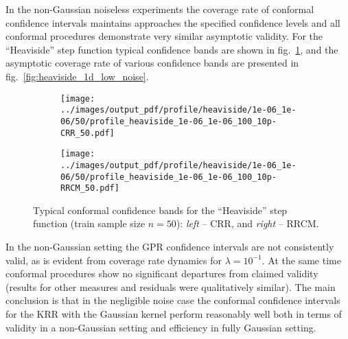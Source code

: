 \documentclass[conference]{IEEEtran}
\begin{document}
In the non-Gaussian noiseless experiments the coverage rate of conformal confidence
intervals maintains approaches the specified confidence levels and all conformal
procedures demonstrate very similar asymptotic validity. For the ``Heaviside''
step function typical confidence bands are shown in fig.~\ref{fig:nongauss_1d_heaviside},
and the asymptotic coverage rate of various confidence bands are presented in
fig.~\ref{fig:heaviside_1d_low_noise}.

\begin{figure}%
  \centering
  \begin{subfigure}[b]{0.5\linewidth}
    \texttt{[image: ../images/output\_pdf/profile/heaviside/1e-06\_1e-06/50/profile\_heaviside\_1e-06\_1e-06\_100\_10p-CRR\_50.pdf]}
  \end{subfigure}%
  \begin{subfigure}[b]{0.5\linewidth}
    \texttt{[image: ../images/output\_pdf/profile/heaviside/1e-06\_1e-06/50/profile\_heaviside\_1e-06\_1e-06\_100\_10p-RRCM\_50.pdf]}
  \end{subfigure}
  \caption{Typical conformal confidence bands for the ``Heaviside'' step function
  (train sample size $n=50$): \textit{left} -- CRR, and \textit{right} -- RRCM.}
  \label{fig:nongauss_1d_heaviside}
\end{figure}

In the non-Gaussian setting the GPR confidence intervals are not consistently valid,
as is evident from coverage rate dynamics for $\lambda=10^{-1}$. At the same time
conformal procedures show no significant departures from claimed validity (results
for other measures and residuals were qualitatively similar). The main conclusion
is that in the negligible noise case the conformal confidence intervals for the KRR
with the Gaussian kernel perform reasonably well both in terms of validity in a
non-Gaussian setting and efficiency in fully Gaussian setting.
\end{document}
